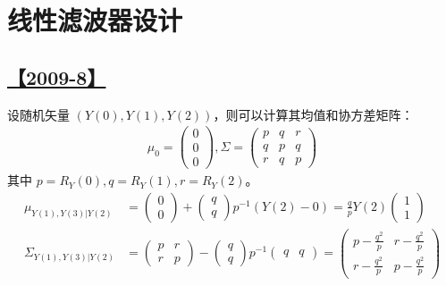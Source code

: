 \section{线性滤波器设计}

\subsection{}

\subsection{\hyperref[Q2009-8]{【2009-8】}}\label{A2009-8}

设随机矢量 $(Y(0), Y(1), Y(2))$，则可以计算其均值和协方差矩阵：
\begin{equation}\tag*{}
\begin{split}
\mu_0=\left(\begin{matrix}0\\0\\0\end{matrix}\right),
\Sigma=\left(\begin{matrix}p&q&r\\q&p&q\\r&q&p\end{matrix}\right)
\end{split}
\end{equation}
其中 $p=R_Y(0), q=R_Y(1), r=R_Y(2)$。
\begin{equation}\tag*{}
\begin{split}
\mu_{Y(1), Y(3)|Y(2)}&=\left(\begin{matrix}0\\0\end{matrix}\right)+\left(\begin{matrix}q\\q\end{matrix}\right)p^{-1}(Y(2)-0)=\frac{q}{p}Y(2)\left(\begin{matrix}1\\1\end{matrix}\right)\\
\Sigma_{Y(1), Y(3)|Y(2)}&=\left(\begin{matrix}p&r\\r&p\end{matrix}\right)-\left(\begin{matrix}q\\q\end{matrix}\right)p^{-1}\left(\begin{matrix}q&q\end{matrix}\right)=\left(\begin{matrix}p-\frac{q^2}{p}&r-\frac{q^2}{p}\\r-\frac{q^2}{p}&p-\frac{q^2}{p}\end{matrix}\right)
\end{split}
\end{equation}
